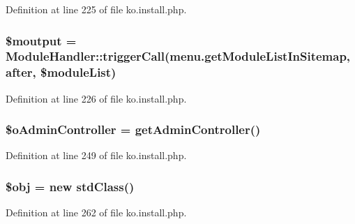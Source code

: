 Definition at line 225 of file ko.\+install.\+php.

\subsubsection[{\texorpdfstring{\$moutput}{$moutput}}]{\setlength{\rightskip}{0pt plus 5cm}\$moutput = {\bf Module\+Handler\+::trigger\+Call}(\textquotesingle{}menu.\+get\+Module\+List\+In\+Sitemap\textquotesingle{}, \textquotesingle{}after\textquotesingle{}, \$module\+List)}\hypertarget{ko_8install_8php_a2598d068355cca17645bc6bd70cc3a8c}{}\label{ko_8install_8php_a2598d068355cca17645bc6bd70cc3a8c}


Definition at line 226 of file ko.\+install.\+php.

\subsubsection[{\texorpdfstring{\$o\+Admin\+Controller}{$oAdminController}}]{\setlength{\rightskip}{0pt plus 5cm}\$o\+Admin\+Controller = {\bf get\+Admin\+Controller}(\textquotesingle{})}\hypertarget{ko_8install_8php_a52d90466dc7adee7d324b3ef032b8167}{}\label{ko_8install_8php_a52d90466dc7adee7d324b3ef032b8167}


Definition at line 249 of file ko.\+install.\+php.

\subsubsection[{\texorpdfstring{\$obj}{$obj}}]{\setlength{\rightskip}{0pt plus 5cm}\$obj = new std\+Class()}\hypertarget{ko_8install_8php_a9008ed94ba185855b1723e367744b87e}{}\label{ko_8install_8php_a9008ed94ba185855b1723e367744b87e}


Definition at line 262 of file ko.\+install.\+php.

